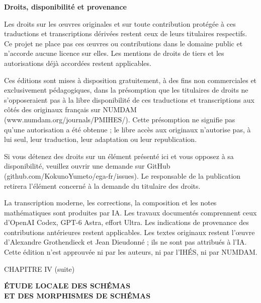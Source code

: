 \documentclass[10pt,oneside]{book}
\newcommand{\oldpage}[2][]{%
  \setcounter{footnote}{0}%
  \marginpar{\scriptsize\textbf{#1}~|~#2}\ignorespaces}
\begin{document}
\clearpage
\begingroup
\small
\noindent\textbf{Droits, disponibilité et provenance}

Les droits sur les œuvres originales et sur toute contribution protégée à ces traductions et transcriptions dérivées restent ceux de leurs titulaires respectifs. Ce projet ne place pas ces œuvres ou contributions dans le domaine public et n'accorde aucune licence sur elles. Les mentions de droits de tiers et les autorisations déjà accordées restent applicables.

Ces éditions sont mises à disposition gratuitement, à des fins non commerciales et exclusivement pédagogiques, dans la présomption que les titulaires de droits ne s'opposeraient pas à la libre disponibilité de ces traductions et transcriptions aux côtés des originaux français sur NUMDAM (www.numdam.org/journals/PMIHES/). Cette présomption ne signifie pas qu'une autorisation a été obtenue ; le libre accès aux originaux n'autorise pas, à lui seul, leur traduction, leur adaptation ou leur republication.

Si vous détenez des droits sur un élément présenté ici et vous opposez à sa disponibilité, veuillez ouvrir une demande sur GitHub (github.com/KokunoYumeto/ega-fr/issues). Le responsable de la publication retirera l'élément concerné à la demande du titulaire des droits.

La transcription moderne, les corrections, la composition et les notes mathématiques sont produites par IA. Les travaux documentés comprennent ceux d'OpenAI Codex, GPT-6 Astra, effort Ultra. Les indications de provenance des contributions antérieures restent applicables. Les textes originaux restent l'œuvre d'Alexandre Grothendieck et Jean Dieudonné ; ils ne sont pas attribués à l'IA. Cette édition n'est approuvée ni par les auteurs, ni par l'IHÉS, ni par NUMDAM.
\par
\endgroup
\clearpage

%
\clearpage
\thispagestyle{plain}
\oldpage[IV-2]{5}
\label{chapter:IV2-fr}

\begin{center}
{\large CHAPITRE IV (suite)\par}
\vspace{1.5em}
{\Large\bfseries ÉTUDE LOCALE DES SCHÉMAS\\
ET DES MORPHISMES DE SCHÉMAS\par}
\end{center}
\end{document}
